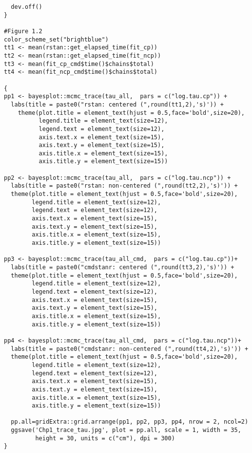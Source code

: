 \begin{verbatim}
  dev.off()
}

#Figure 1.2
color_scheme_set("brightblue")
tt1 <- mean(rstan::get_elapsed_time(fit_cp))
tt2 <- mean(rstan::get_elapsed_time(fit_ncp))
tt3 <- mean(fit_cp_cmd$time()$chains$total)
tt4 <- mean(fit_ncp_cmd$time()$chains$total)

{
pp1 <- bayesplot::mcmc_trace(tau_all,  pars = c("log.tau.cp")) +
  labs(title = paste0("rstan: centered (",round(tt1,2),'s)')) +
    theme(plot.title = element_text(hjust = 0.5,face='bold',size=20),
          legend.title = element_text(size=12),
          legend.text = element_text(size=12),
          axis.text.x = element_text(size=15),
          axis.text.y = element_text(size=15),
          axis.title.x = element_text(size=15),
          axis.title.y = element_text(size=15))

pp2 <- bayesplot::mcmc_trace(tau_all,  pars = c("log.tau.ncp")) +
  labs(title = paste0("rstan: non-centered (",round(tt2,2),'s)')) +
  theme(plot.title = element_text(hjust = 0.5,face='bold',size=20),
        legend.title = element_text(size=12),
        legend.text = element_text(size=12),
        axis.text.x = element_text(size=15),
        axis.text.y = element_text(size=15),
        axis.title.x = element_text(size=15),
        axis.title.y = element_text(size=15))

pp3 <- bayesplot::mcmc_trace(tau_all_cmd,  pars = c("log.tau.cp"))+
  labs(title = paste0("cmdstanr: centered (",round(tt3,2),'s)')) +
  theme(plot.title = element_text(hjust = 0.5,face='bold',size=20),
        legend.title = element_text(size=12),
        legend.text = element_text(size=12),
        axis.text.x = element_text(size=15),
        axis.text.y = element_text(size=15),
        axis.title.x = element_text(size=15),
        axis.title.y = element_text(size=15))

pp4 <- bayesplot::mcmc_trace(tau_all_cmd,  pars = c("log.tau.ncp"))+
  labs(title = paste0("cmdstanr: non-centered (",round(tt4,2),'s)')) +
  theme(plot.title = element_text(hjust = 0.5,face='bold',size=20),
        legend.title = element_text(size=12),
        legend.text = element_text(size=12),
        axis.text.x = element_text(size=15),
        axis.text.y = element_text(size=15),
        axis.title.x = element_text(size=15),
        axis.title.y = element_text(size=15))

  pp.all=gridExtra::grid.arrange(pp1, pp2, pp3, pp4, nrow = 2, ncol=2)
  ggsave('Chp1_trace_tau.jpg', plot = pp.all, scale = 1, width = 35, 
         height = 30, units = c("cm"), dpi = 300)
}

\end{verbatim}

